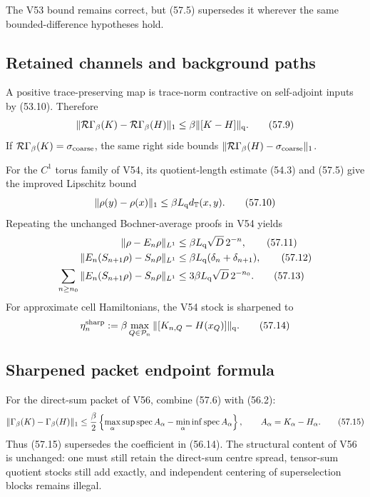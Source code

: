 \documentclass[11pt]{article}
\theoremstyle{remark}
\begin{document}
The V53 bound remains correct, but (57.5) supersedes it wherever the
same bounded-difference hypotheses hold.

\subsection{Retained channels and background paths}

A positive trace-preserving map is trace-norm contractive on
self-adjoint inputs by (53.10).  Therefore
\begin{equation}
 \|{\cal R}\Gamma_\beta(K)-{\cal R}\Gamma_\beta(H)\|_1
 \leq
 \beta\|[K-H]\|_{\rm q}.                           \tag{57.9}
\end{equation}
If \({\cal R}\Gamma_\beta(K)=\sigma_{\rm coarse}\), the same right
side bounds
\(\|{\cal R}\Gamma_\beta(H)-\sigma_{\rm coarse}\|_1\).

For the \(C^1\) torus family of V54, its quotient-length estimate
(54.3) and (57.5) give the improved Lipschitz bound
\begin{equation}
 \|\rho(y)-\rho(x)\|_1
 \leq
 \beta L_{\rm q}d_{\mathbb T}(x,y).               \tag{57.10}
\end{equation}
Repeating the unchanged Bochner-average proofs in V54 yields
\begin{align}
 \|\rho-E_n\rho\|_{L^1}
 &\leq
 \beta L_{\rm q}\sqrt D\,2^{-n},                  \tag{57.11}\\
 \|E_n(S_{n+1}\rho)-S_n\rho\|_{L^1}
 &\leq
 \beta L_{\rm q}(\delta_n+\delta_{n+1}),           \tag{57.12}\\
 \sum_{n\geq n_0}
 \|E_n(S_{n+1}\rho)-S_n\rho\|_{L^1}
 &\leq
 3\beta L_{\rm q}\sqrt D\,2^{-n_0}.               \tag{57.13}
\end{align}
For approximate cell Hamiltonians, the V54 stock is sharpened to
\begin{equation}
 \eta_n^{\rm sharp}
 :=
 \beta\max_{Q\in{\cal P}_n}
 \|[K_{n,Q}-H(x_Q)]\|_{\rm q}.                    \tag{57.14}
\end{equation}

\subsection{Sharpened packet endpoint formula}

For the direct-sum packet of V56, combine (57.6) with (56.2):
\begin{equation}
 \|\Gamma_\beta(K)-\Gamma_\beta(H)\|_1
 \leq
 {\beta\over2}
 \left\{
 \max_\alpha\sup\operatorname{spec}A_\alpha
 -
 \min_\alpha\inf\operatorname{spec}A_\alpha
 \right\},
 \qquad A_\alpha=K_\alpha-H_\alpha.               \tag{57.15}
\end{equation}
Thus (57.15) supersedes the coefficient in (56.14).  The structural
content of V56 is unchanged: one must still retain the direct-sum
centre spread, tensor-sum quotient stocks still add exactly, and
independent centering of superselection blocks remains illegal.
\end{document}

